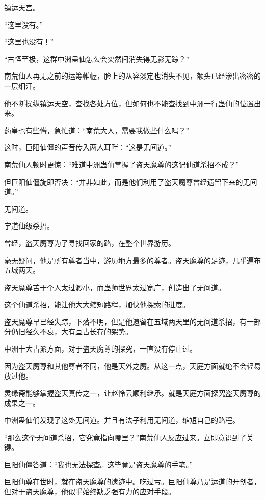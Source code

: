 
\begin{this_body}

镇运天宫。

“这里没有。”

“这里也没有！”

“古怪至极，这群中洲蛊仙怎么会突然间消失得无影无踪？”

南荒仙人再无之前的运筹帷幄，脸上的从容淡定也消失不见，额头已经渗出密密的一层细汗。

他不断操纵镇运天空，查找各处方位，但如何也不能查找到中洲一行蛊仙的位置出来。

药皇也有些懵，急忙道：“南荒大人，需要我做些什么吗？”

这时，巨阳仙僵的声音传入两人耳畔：“这是无间道。”

南荒仙人顿时更惊：“难道中洲蛊仙掌握了盗天魔尊的这记仙道杀招不成？”

但巨阳仙僵旋即否决：“并非如此，而是他们利用了盗天魔尊曾经遗留下来的无间道。”

无间道。

宇道仙级杀招。

曾经，盗天魔尊为了寻找回家的路，在整个世界游历。

毫无疑问，他是所有尊者当中，游历地方最多的尊者。盗天魔尊的足迹，几乎遍布五域两天。

盗天魔尊苦于个人太过渺小，而蛊师世界太过宽广，创造出了无间道。

这个仙道杀招，能让他大大缩短路程，加快他探索的进度。

盗天魔尊早已经失踪，下落不明，但是他遗留在五域两天里的无间道杀招，有一部分仍旧经久不衰，大有亘古长存的架势。

中洲十大古派方面，对于盗天魔尊的探究，一直没有停止过。

因为盗天魔尊和其他尊者不同，他是天外之魔。从这一点，天庭方面就绝不会轻易放过他。

灵缘斋能够掌握盗天真传之一，让赵怜云顺利继承。就是天庭方面探究盗天魔尊的成果之一。

中洲蛊仙们发现了这处无间道。并且有法子利用无间道，缩短自己的路程。

“那么这个无间道杀招，它究竟指向哪里？”南荒仙人反应过来。立即意识到了关键。

巨阳仙僵答道：“我也无法探查。这毕竟是盗天魔尊的手笔。”

巨阳仙尊在世时，就在盗天魔尊的遗迹中。吃过亏。巨阳仙尊乃是运道的开创者，但对于盗天魔尊，他似乎始终缺乏强有力的应对手段。


\end{this_body}

